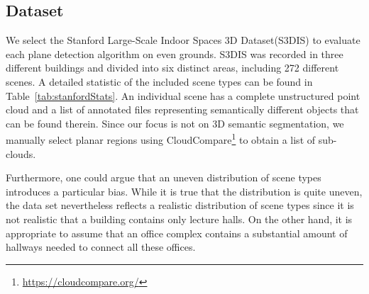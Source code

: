 \documentclass[main.tex]{subfiles}
\begin{document}
\subsection{Dataset}
We select the Stanford Large-Scale Indoor Spaces 3D Dataset(S3DIS)\cite{2017arXiv170201105A} to evaluate each plane detection algorithm on even grounds.
S3DIS was recorded in three different buildings and divided into six distinct areas, including 272 different scenes. A detailed statistic of the included scene types can be found in Table~\ref{tab:stanfordStats}.
An individual scene has a complete unstructured point cloud and a list of annotated files representing semantically different objects that can be found therein.
Since our focus is not on 3D semantic segmentation, we manually select planar regions using CloudCompare\footnote{\href{https://cloudcompare.org/}{https://cloudcompare.org/}} to obtain a list of sub-clouds.

Furthermore, one could argue that an uneven distribution of scene types introduces a particular bias. While it is true that the distribution is quite uneven, the data set nevertheless reflects a realistic distribution of scene types since
it is not realistic that a building contains only lecture halls. On the other hand, it is appropriate to assume that an office complex contains a substantial amount of hallways needed to connect all these offices.
\end{document}
